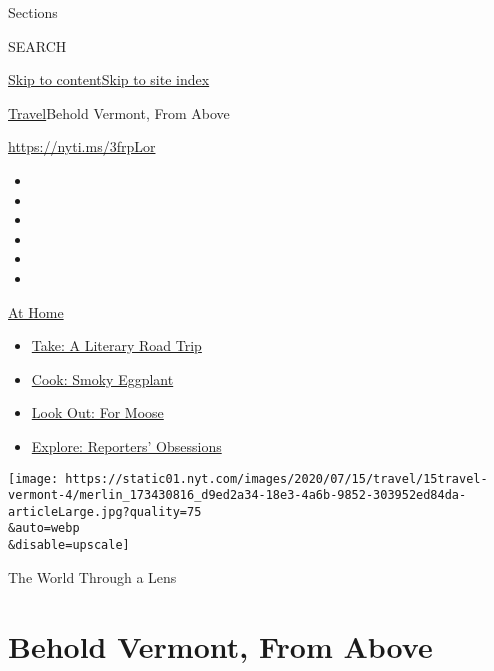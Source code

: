 Sections

SEARCH

\protect\hyperlink{site-content}{Skip to
content}\protect\hyperlink{site-index}{Skip to site index}

\href{/section/travel}{Travel}\textbar{}Behold Vermont, From Above

\url{https://nyti.ms/3frpLor}

\begin{itemize}
\item
\item
\item
\item
\item
\item
\end{itemize}

\href{https://www.nytimes.com/spotlight/at-home?action=click\&pgtype=Article\&state=default\&region=TOP_BANNER\&context=at_home_menu}{At
Home}

\begin{itemize}
\tightlist
\item
  \href{https://www.nytimes.com/2020/07/28/books/time-for-a-literary-road-trip.html?action=click\&pgtype=Article\&state=default\&region=TOP_BANNER\&context=at_home_menu}{Take:
  A Literary Road Trip}
\item
  \href{https://www.nytimes.com/2020/07/29/magazine/bored-with-your-home-cooking-some-smoky-eggplant-will-fix-that.html?action=click\&pgtype=Article\&state=default\&region=TOP_BANNER\&context=at_home_menu}{Cook:
  Smoky Eggplant}
\item
  \href{https://www.nytimes.com/2020/07/27/travel/moose-michigan-isle-royale.html?action=click\&pgtype=Article\&state=default\&region=TOP_BANNER\&context=at_home_menu}{Look
  Out: For Moose}
\item
  \href{https://www.nytimes.com/interactive/2020/at-home/even-more-reporters-editors-diaries-lists-recommendations.html?action=click\&pgtype=Article\&state=default\&region=TOP_BANNER\&context=at_home_menu}{Explore:
  Reporters' Obsessions}
\end{itemize}

\texttt{[image: https://static01.nyt.com/images/2020/07/15/travel/15travel-vermont-4/merlin\_173430816\_d9ed2a34-18e3-4a6b-9852-303952ed84da-articleLarge.jpg?quality=75\\\&auto=webp\\\&disable=upscale]}

The World Through a Lens

\hypertarget{behold-vermont-from-above}{%
\section{Behold Vermont, From Above}\label{behold-vermont-from-above}}

